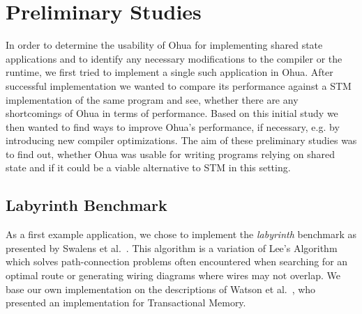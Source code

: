 %
\chapter{Preliminary Studies}
\label{sec:preliminary}

In order to determine the usability of Ohua for implementing shared state applications and to identify any necessary modifications to the compiler or the runtime, we first tried to implement a single such application in Ohua.
After successful implementation we wanted to compare its performance against a STM implementation of the same program and see, whether there are any shortcomings of Ohua in terms of performance.
Based on this initial study we then wanted to find ways to improve Ohua's performance, if necessary, e.g. by introducing new compiler optimizations.
The aim of these preliminary studies was to find out, whether Ohua was usable for writing programs relying on shared state and if it could be a viable alternative to STM in this setting.

\section{Labyrinth Benchmark}

As a first example application, we chose to implement the \emph{labyrinth} benchmark as presented by Swalens et al.~\cite{swalens2016transactional}.
This algorithm is a variation of Lee's Algorithm~\cite{lee1961algorithm} which solves path-connection problems often encountered when searching for an optimal route or generating wiring diagrams where wires may not overlap.
We base our own implementation on the descriptions of Watson et al.~\cite{watson2007study}, who presented an implementation for Transactional Memory.

